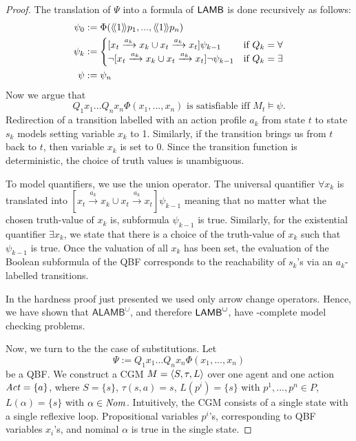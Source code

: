 \begin{proof}
The translation of $\Psi$ into a formula of $\mathsf{LAMB}$ is done recursively as follows:
\begin{align*}
    \psi_0 &:= \Phi(\langle \! \langle 1 \rangle \! \rangle p_1, ..., \langle \! \langle 1 \rangle \! \rangle p_n) \\
    \psi_k &:=
    \begin{cases}
        [x_t \xrightarrow{a_k} x_k \cup x_t \xrightarrow{a_k} x_t] \psi_{k-1} &\text{if } Q_k = \forall\\ 
        \lnot [x_t \xrightarrow{a_k} x_k \cup x_t \xrightarrow{a_k} x_t] \lnot \psi_{k-1} &\text{if } Q_k = \exists\\
    \end{cases}\\
\psi &:= \psi_n
\end{align*}
Now we argue that 
\[Q_1 x_1 ... Q_n x_n \Phi (x_1, ..., x_n) \text{ is satisfiable iff } M_t \models \psi.\]
Redirection of a transition labelled with an action profile $a_k$ from state $t$ to state $s_k$ models setting variable $x_k$ to 1. Similarly, if the transition brings us from $t$ back to $t$, then variable $x_k$ is set to 0. Since the transition function is deterministic, the choice of truth values is unambiguous. 

To model quantifiers, we use the union operator. The universal quantifier $\forall x_k$ is translated into $[x_t \xrightarrow{a_k} x_k \cup x_t \xrightarrow{a_k} x_t] \psi_{k-1}$ meaning that no matter what the chosen truth-value of $x_k$ is, subformula $\psi_{k-1}$ is true. Similarly, for the existential quantifier $\exists x_k$, we state that there is a choice of the truth-value of $x_k$ such that $\psi_{k-1}$ is true. Once the valuation of all $x_k$ has been set, the evaluation of the Boolean subformula of the QBF corresponds to the reachability of $s_k$'s via an $a_k$-labelled transitions. 

In the hardness proof just presented %
 we used only arrow change operators. Hence, we have shown that $\mathsf{ALAMB}^\cup$, and therefore $\mathsf{LAMB}^\cup$, have \Pspace-complete model checking problems.  

Now, we turn to the the case of substitutions. Let $$\Psi := Q_1 x_1 ... Q_n x_n \Phi (x_1, ..., x_n)$$ be a QBF. We construct a CGM $M = \langle S, \tau, L\rangle$ over one agent and one action $\mathit{Act} = \{a\}$, where $S = \{s\}$, $\tau(s , a) = s$, $L(p^i) = \{s\}$ with $p^1, ..., p^n \in P$, $L(\alpha) = \{s\}$ with $\alpha \in \mathit{Nom}$. Intuitively, the CGM consists of a single state with a single reflexive loop. Propositional variables $p^i$'s, corresponding to QBF variables $x_i$'s, and nominal $\alpha$ is true in the single state. 


\end{proof}
